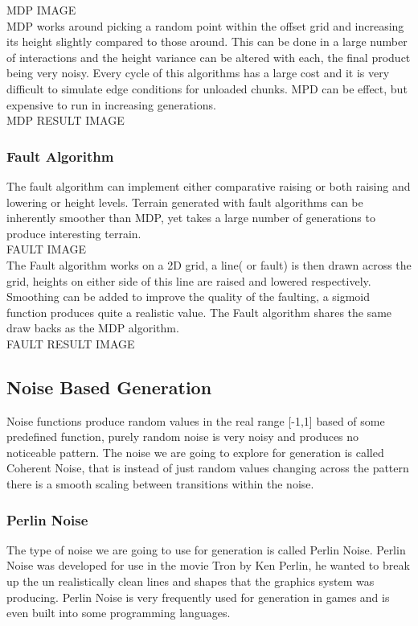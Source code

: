 MDP IMAGE\\

MDP works around picking a random point within the offset grid and increasing its
height slightly compared to those around. This can be done in a large number of 
interactions and the height variance can be altered with each, the final product 
being very noisy. Every cycle of this algorithms has a large cost and it is very
difficult to simulate edge conditions for unloaded chunks. MPD can be effect, but
expensive to run in increasing generations.\\

MDP RESULT IMAGE\\

\subsubsection*{Fault Algorithm}
The fault algorithm can implement either comparative raising or both raising and
lowering or height levels. Terrain generated with fault algorithms can be 
inherently smoother than MDP, yet takes a large number of generations to produce
interesting terrain.\\

FAULT IMAGE\\

The Fault algorithm works on a 2D grid, a line( or fault) is then drawn across the
grid, heights on either side of this line are raised and lowered respectively.
Smoothing can be added to improve the quality of the faulting, a sigmoid 
function produces quite a realistic value. The Fault algorithm shares the same
draw backs as the MDP algorithm.\\

FAULT RESULT IMAGE\\

\subsection{Noise Based Generation}
Noise functions produce random values in the real range [-1,1] based of some 
predefined function, purely random noise is very noisy and produces no noticeable
pattern. The noise we are going to explore for generation is called Coherent
Noise, that is instead of just random values changing across the pattern there 
is a smooth scaling between transitions within the noise.\\

\subsubsection*{Perlin Noise}
The type of noise we are going to use for generation is called Perlin Noise. 
Perlin Noise was developed for use in the movie Tron by Ken Perlin, he wanted to
break up the un realistically clean lines and shapes that the graphics system was
producing. Perlin Noise is very frequently used for generation in games and is 
even built into some programming languages.\\

